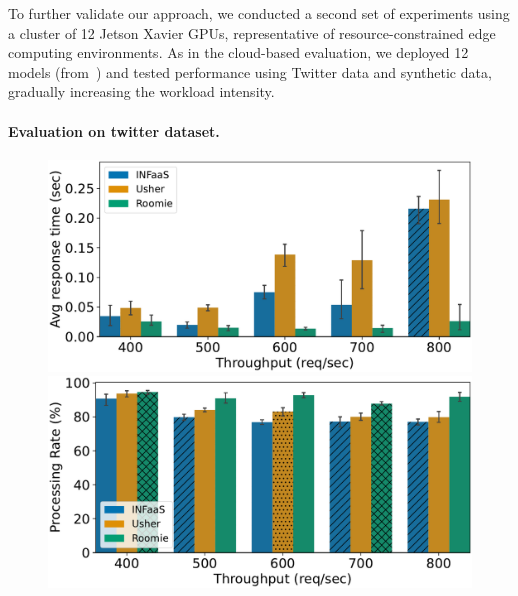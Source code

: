 To further validate our approach, we conducted a second set of experiments using a cluster of 12 Jetson Xavier GPUs, representative of resource-constrained edge computing environments. As in the cloud-based evaluation, we deployed 12 models (from~) and tested performance using Twitter data and synthetic data, gradually increasing the workload intensity.

\paragraph{Evaluation on twitter dataset.}

\begin{figure}
	\begin{minipage}[t]{.24\linewidth}
		\centering
		\includegraphics[width=\linewidth]{chapters/roomie/images/JetsonNano/twitter-all-models/response_time.pdf}
	\end{minipage}
	\hfill
	\begin{minipage}[t]{.24\linewidth}
		\centering
		\includegraphics[width=\linewidth]{chapters/roomie/images/JetsonNano/twitter-all-models/normalized.pdf}
	\end{minipage}
	\hfill
	\begin{minipage}[t]{.24\linewidth}

\end{minipage}
\end{figure}

